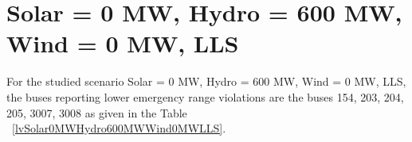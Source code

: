 \documentclass[10pt]{report}
\begin{document}
\section{Solar = 0 MW, Hydro = 600 MW, Wind = 0 MW, LLS}
For the studied scenario Solar = 0 MW, Hydro = 600 MW, Wind = 0 MW, LLS, the buses reporting lower emergency range violations are the buses 154, 203, 204, 205, 3007, 3008 as given in the Table ~\ref{lvSolar0MWHydro600MWWind0MWLLS}.
\begin{table}[H]
\caption{Contingencies reporting bus voltages lower than emergency voltage of 1.1 PU for scenario Solar = 0 MW, Hydro = 600 MW, Wind = 0 MW, LLS}
\label{lvSolar0MWHydro600MWWind0MWLLS}
\centering
{}
\end{table}
\end{document}
